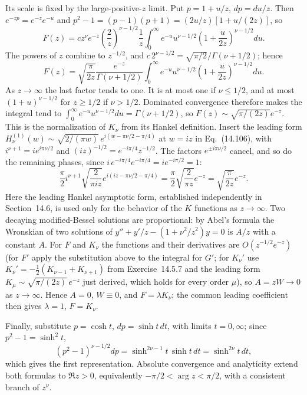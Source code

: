 Its scale is fixed by the large-positive-$z$ limit. Put
$p=1+u/z$, $dp=du/z$. Then $e^{-zp}=e^{-z}e^{-u}$ and
$p^2-1=(p-1)(p+1)=(2u/z)[1+u/(2z)]$, so
\[
F(z)=cz^\nu e^{-z}\left(\frac2z\right)^{\nu-1/2}\frac1z
\int_0^\infty e^{-u}u^{\nu-1/2}
\left(1+\frac{u}{2z}\right)^{\nu-1/2}du.
\]
The powers of $z$ combine to $z^{-1/2}$, and
$c\,2^{\nu-1/2}=\sqrt{\pi/2}/\Gamma(\nu+1/2)$; hence
\[
F(z)=\sqrt{\frac\pi{2z}}\frac{e^{-z}}{\Gamma(\nu+1/2)}
\int_0^\infty e^{-u}u^{\nu-1/2}
\left(1+\frac{u}{2z}\right)^{\nu-1/2}du.
\]
As $z\to\infty$ the last factor tends to one. It is at most one if
$\nu\le1/2$, and at most $(1+u)^{\nu-1/2}$ for $z\ge1/2$ if
$\nu>1/2$. Dominated convergence therefore makes the integral tend
to $\int_0^\infty e^{-u}u^{\nu-1/2}du=\Gamma(\nu+1/2)$, so
$F(z)\sim\sqrt{\pi/(2z)}e^{-z}$.
This is the normalization of $K_\nu$ from its Hankel definition.
Insert the leading form
$H_\nu^{(1)}(w)\sim\sqrt{2/(\pi w)}\,e^{i(w-\pi\nu/2-\pi/4)}$ at
$w=iz$ in Eq.~(14.106), with $i^{\nu+1}=ie^{i\pi\nu/2}$ and
$(iz)^{-1/2}=e^{-i\pi/4}z^{-1/2}$. The factors $e^{\pm i\pi\nu/2}$
cancel, and so do the remaining phases, since
$i\,e^{-i\pi/4}e^{-i\pi/4}=ie^{-i\pi/2}=1$:
\[
\frac\pi2i^{\nu+1}
\sqrt{\frac2{\pi iz}}
e^{i(iz-\pi\nu/2-\pi/4)}
=\frac\pi2\sqrt{\frac2{\pi z}}e^{-z}
=\sqrt{\frac\pi{2z}}e^{-z}.
\]
Here the leading Hankel asymptotic form, established independently
in Section~14.6, is used only for the behavior of the $K$ functions
as $z\to\infty$.
Two decaying modified-Bessel solutions are proportional: by Abel's
formula the Wronskian of two solutions of
$y''+y'/z-(1+\nu^2/z^2)y=0$ is $A/z$ with a constant $A$. For $F$
and $K_\nu$ the functions and their derivatives are
$O(z^{-1/2}e^{-z})$ (for $F'$ apply the substitution above to the
integral for $G'$; for $K_\nu'$ use
$K_\nu'=-\frac12(K_{\nu-1}+K_{\nu+1})$ from Exercise~14.5.7 and the
leading form $K_\mu\sim\sqrt{\pi/(2z)}\,e^{-z}$ just derived, which
holds for every order $\mu$), so $A=zW\to0$ as $z\to\infty$. Hence $A=0$,
$W\equiv0$, and $F=\lambda K_\nu$; the common leading coefficient
then gives $\lambda=1$, $F=K_\nu$.

Finally, substitute $p=\cosh t$, $dp=\sinh t\,dt$, with limits
$t=0,\infty$; since $p^2-1=\sinh^2t$,
\[
(p^2-1)^{\nu-1/2}dp=\sinh^{2\nu-1}t\,\sinh t\,dt
=\sinh^{2\nu}t\,dt,
\]
which gives the first representation. Absolute convergence and
analyticity extend both formulas to $\Re z>0$, equivalently
$-\pi/2<\arg z<\pi/2$, with a consistent branch of $z^\nu$.

